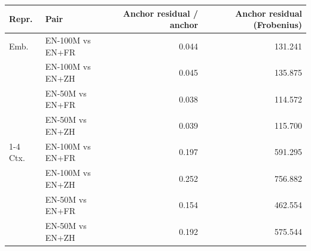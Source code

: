 \begin{tabular}{@{}llrr@{}}
\toprule
Repr. & Pair & Anchor residual / anchor & Anchor residual (Frobenius) \\
\midrule
Emb. & EN-100M vs EN+FR & 0.044 & 131.241 \\
 & EN-100M vs EN+ZH & 0.045 & 135.875 \\
 & EN-50M vs EN+FR & 0.038 & 114.572 \\
 & EN-50M vs EN+ZH & 0.039 & 115.700 \\
\cmidrule(lr){1-4}
Ctx. & EN-100M vs EN+FR & 0.197 & 591.295 \\
 & EN-100M vs EN+ZH & 0.252 & 756.882 \\
 & EN-50M vs EN+FR & 0.154 & 462.554 \\
 & EN-50M vs EN+ZH & 0.192 & 575.544 \\
\bottomrule
\end{tabular}
